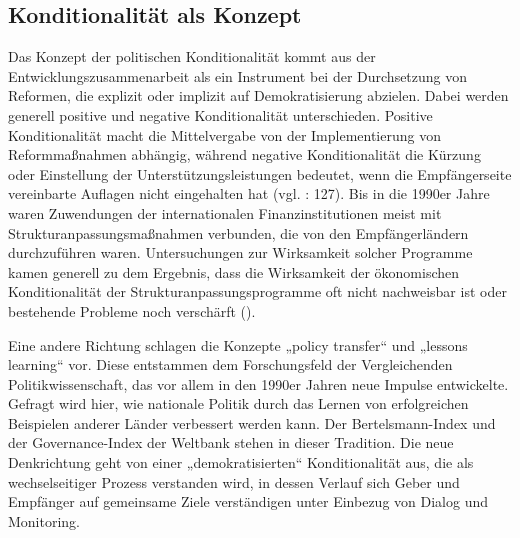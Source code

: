 \subsection{Konditionalität als Konzept}
Das Konzept der politischen Konditionalität kommt aus der Entwicklungszusammenarbeit als ein Instrument bei der Durchsetzung von Reformen, die explizit oder implizit auf Demokratisierung abzielen. Dabei werden generell positive und negative Konditionalität unterschieden. Positive Konditionalität macht die Mittelvergabe von der Implementierung von Reformmaßnahmen abhängig, während negative Konditionalität die Kürzung oder Einstellung der Unterstützungsleistungen bedeutet, wenn die Empfängerseite vereinbarte Auflagen nicht eingehalten hat (vgl. \cite{schmitz09} : 127). Bis in die 1990er Jahre waren Zuwendungen der internationalen Finanzinstitutionen meist mit Strukturanpassungsmaßnahmen verbunden, die von den Empfängerländern durchzuführen waren. Untersuchungen zur Wirksamkeit solcher Programme kamen generell zu dem Ergebnis, dass die Wirksamkeit der ökonomischen Konditionalität der Strukturanpassungsprogramme oft nicht nachweisbar ist oder bestehende Probleme noch verschärft (\cite{killick, morrissey}). 
\par
Eine andere Richtung schlagen die Konzepte „policy transfer“ und „lessons learning“ vor. Diese entstammen dem Forschungsfeld der Vergleichenden Politikwissenschaft, das vor allem in den 1990er Jahren neue Impulse entwickelte. Gefragt wird hier, wie nationale Politik durch das Lernen von erfolgreichen Beispielen anderer Länder verbessert werden kann. Der Bertelsmann-Index und der Governance-Index der Weltbank stehen in dieser Tradition. Die neue Denkrichtung geht von einer „demokratisierten“ Konditionalität aus, die als wechselseitiger Prozess verstanden wird, in dessen Verlauf sich Geber und Empfänger auf gemeinsame Ziele verständigen unter Einbezug von Dialog und Monitoring.
